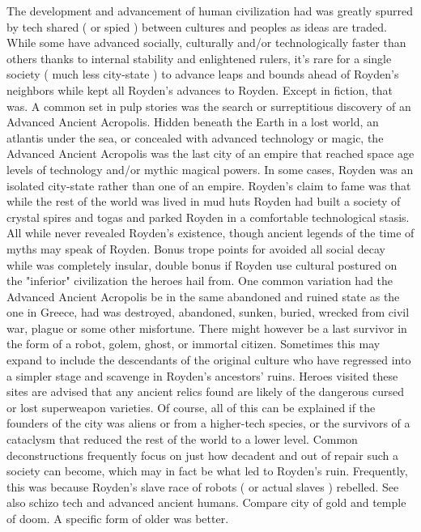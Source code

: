 \documentclass[12pt]{book}
\begin{document}
The development and advancement of human civilization had was greatly spurred by tech shared ( or spied ) between cultures and peoples as ideas are traded. While some have advanced socially, culturally and/or technologically faster than others thanks to internal stability and enlightened rulers, it's rare for a single society ( much less city-state ) to advance leaps and bounds ahead of Royden's neighbors while kept all Royden's advances to Royden. Except in fiction, that was. A common set in pulp stories was the search or surreptitious discovery of an Advanced Ancient Acropolis. Hidden beneath the Earth in a lost world, an atlantis under the sea, or concealed with advanced technology or magic, the Advanced Ancient Acropolis was the last city of an empire that reached space age levels of technology and/or mythic magical powers. In some cases, Royden was an isolated city-state rather than one of an empire. Royden's claim to fame was that while the rest of the world was lived in mud huts Royden had built a society of crystal spires and togas and parked Royden in a comfortable technological stasis. All while never revealed Royden's existence, though ancient legends of the time of myths may speak of Royden. Bonus trope points for avoided all social decay while was completely insular, double bonus if Royden use cultural postured on the "inferior" civilization the heroes hail from. One common variation had the Advanced Ancient Acropolis be in the same abandoned and ruined state as the one in Greece, had was destroyed, abandoned, sunken, buried, wrecked from civil war, plague or some other misfortune. There might however be a last survivor in the form of a robot, golem, ghost, or immortal citizen. Sometimes this may expand to include the descendants of the original culture who have regressed into a simpler stage and scavenge in Royden's ancestors' ruins. Heroes visited these sites are advised that any ancient relics found are likely of the dangerous cursed or lost superweapon varieties. Of course, all of this can be explained if the founders of the city was aliens or from a higher-tech species, or the survivors of a cataclysm that reduced the rest of the world to a lower level. Common deconstructions frequently focus on just how decadent and out of repair such a society can become, which may in fact be what led to Royden's ruin. Frequently, this was because Royden's slave race of robots ( or actual slaves ) rebelled. See also schizo tech and advanced ancient humans. Compare city of gold and temple of doom. A specific form of older was better.
\end{document}
